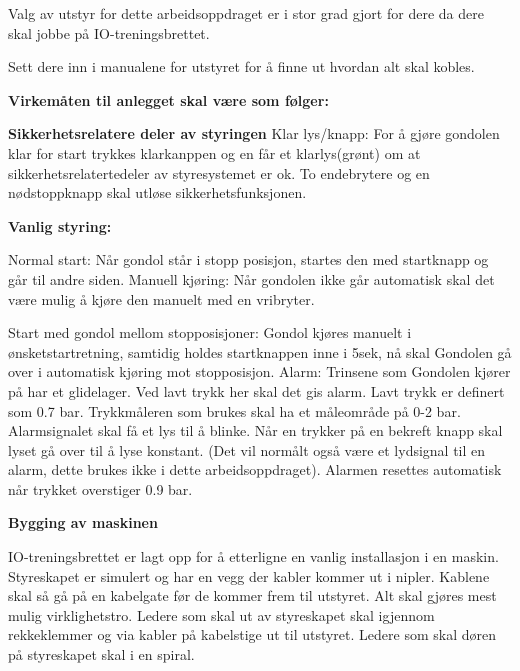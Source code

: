 \vskip 10pt


Valg av utstyr for dette arbeidsoppdraget er i stor grad gjort for dere da dere skal jobbe på IO-treningsbrettet. 

Sett dere inn i manualene for utstyret for å finne ut hvordan alt skal kobles. 


\vskip 10pt


{\bf Virkemåten til anlegget skal  være som følger:}
\vskip 10pt 

{\bf Sikkerhetsrelatere deler av styringen}
\vskip 10pt
Klar lys/knapp: For å gjøre gondolen klar for start trykkes klarkanppen og en får et klarlys(grønt) om at sikkerhetsrelatertedeler av styresystemet er ok. To endebrytere og en nødstoppknapp skal utløse sikkerhetsfunksjonen. 
\vskip 10pt 

\textbf{Vanlig styring:}
\vskip 10pt 

Normal start: Når gondol står i stopp posisjon, startes den med startknapp og går til andre siden.
\vskip 10pt 
Manuell kjøring: Når gondolen ikke går automatisk skal det være mulig å kjøre den manuelt med en vribryter. 

\vskip 10pt 
Start med gondol mellom stopposisjoner: Gondol kjøres manuelt i ønsketstartretning, samtidig holdes startknappen inne i 5sek, nå skal Gondolen gå over i automatisk kjøring mot stopposisjon.
\vskip 10pt 
Alarm: Trinsene som Gondolen kjører på har et glidelager. Ved lavt trykk her skal det gis alarm. Lavt trykk er definert som 0.7 bar. Trykkmåleren som brukes skal ha et måleområde på 0-2 bar. Alarmsignalet skal få et lys til å blinke. Når en trykker på en bekreft knapp skal lyset gå over til å lyse konstant. (Det vil normålt også være et lydsignal til en alarm, dette brukes ikke i dette arbeidsoppdraget). Alarmen resettes automatisk når trykket overstiger 0.9 bar. 
\vskip 10pt 
\vfil \eject

\noindent
{\bf Bygging av maskinen}

\vskip 5pt

IO-treningsbrettet er lagt opp for å etterligne en vanlig installasjon i en maskin. Styreskapet er simulert og har en vegg der kabler kommer ut i nipler. Kablene skal så gå på en kabelgate før de kommer frem til utstyret. Alt skal gjøres mest mulig virklighetstro. Ledere som skal ut av styreskapet skal igjennom rekkeklemmer og via kabler på kabelstige ut til utstyret. Ledere som skal døren på styreskapet skal i en spiral. 


